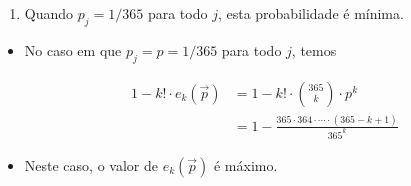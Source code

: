 \documentclass[
  11pt]{report}
\providecommand{\tightlist}{%
  \setlength{\itemsep}{0pt}\setlength{\parskip}{0pt}}
\begin{document}
\begin{rmdbox}

\begin{enumerate}
\def\labelenumi{\alph{enumi}.}
\setcounter{enumi}{1}
\tightlist
\item
  Quando $p_j = 1/365$ para todo $j$, esta probabilidade é mínima.
\end{enumerate}

\end{rmdbox}

\begin{itemize}
\item
  No caso em que $p_j = p = 1/365$ para todo $j$, temos

  \[
   \begin{aligned}
     1 - k! \cdot e_k(\vec p) 
     &=
     1 - k! \cdot \binom{365}{k} \cdot p^k \\
     &=
     1 - \frac{365 \cdot 364 \cdot \cdots \cdot (365 - k + 1)}{365^k}
   \end{aligned}
   \]
\item
  Neste caso, o valor de $e_k(\vec p)$ é máximo.
\end{itemize}
\end{document}
